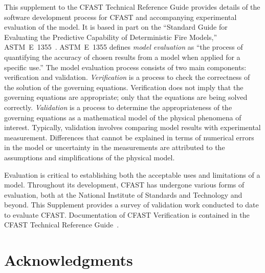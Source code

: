 \documentclass[12pt]{book}
\begin{document}
This supplement to the CFAST Technical Reference Guide provides details of the software development process for CFAST and accompanying experimental evaluation of the model. It is based in part on the ``Standard Guide for Evaluating the Predictive Capability of Deterministic Fire Models,'' ASTM~E~1355~\cite{ASTM:E1355}. ASTM~E~1355 defines {\em model evaluation} as ``the process of quantifying the accuracy of chosen results from a model when applied for a specific use.'' The model evaluation process consists of two main components: verification and validation. {\em Verification} is a process to check the correctness of the solution of the governing equations. Verification does not imply that the governing equations are appropriate; only that the equations are being solved correctly. {\em Validation} is a process to determine the appropriateness of the governing equations as a mathematical model of the physical phenomena of interest. Typically, validation involves comparing model results with experimental measurement. Differences that cannot be explained in terms of numerical errors in the model or uncertainty in the measurements are attributed to the assumptions and simplifications of the physical model.

Evaluation is critical to establishing both the acceptable uses and limitations of a model. Throughout its development, CFAST has undergone various forms of evaluation, both at the National Institute of Standards and Technology and beyond. This Supplement provides a survey of validation work conducted to date to evaluate CFAST. Documentation of CFAST Verification is contained in the CFAST Technical Reference Guide~\cite{CFAST_Tech_Guide_6}.

\chapter{Acknowledgments}

\label{acksection}
\end{document}
